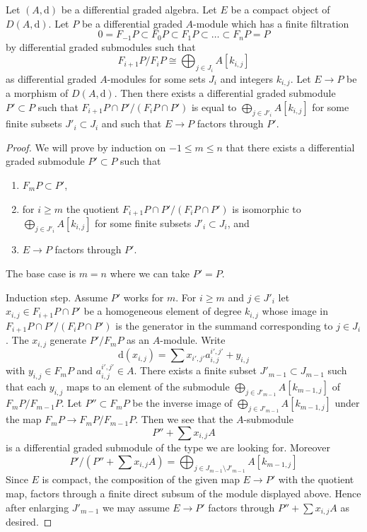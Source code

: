 \begin{lemma}
\label{lemma-factor-through-nicer}
Let $(A, \text{d})$ be a differential graded algebra. Let $E$ be a compact
object of $D(A, \text{d})$. Let $P$ be a differential graded $A$-module
which has a finite filtration
$$
0 = F_{-1}P \subset F_0P \subset F_1P \subset \ldots \subset F_nP = P
$$
by differential graded submodules such that
$$
F_{i + 1}P/F_iP \cong \bigoplus\nolimits_{j \in J_i} A[k_{i, j}]
$$
as differential graded $A$-modules for some sets $J_i$ and integers $k_{i, j}$.
Let $E \to P$ be a morphism of $D(A, \text{d})$.
Then there exists a differential graded submodule $P' \subset P$ such that
$F_{i + 1}P \cap P'/(F_iP \cap P')$ is equal to
$\bigoplus_{j \in J'_i} A[k_{i, j}]$ for some finite subsets
$J'_i \subset J_i$ and such that $E \to P$ factors through $P'$.
\end{lemma}

\begin{proof}
We will prove by induction on $-1 \leq m \leq n$ that there exists
a differential graded submodule $P' \subset P$  such that
\begin{enumerate}
\item $F_mP \subset P'$,
\item for $i \geq m$ the quotient $F_{i + 1}P \cap P'/(F_iP \cap P')$ is
isomorphic to $\bigoplus_{j \in J'_i} A[k_{i, j}]$ for some finite subsets
$J'_i \subset J_i$, and
\item $E \to P$ factors through $P'$.
\end{enumerate}
The base case is $m = n$ where we can take $P' = P$.

\medskip\noindent
Induction step. Assume $P'$ works for $m$.
For $i \geq m$ and $j \in J'_i$ let $x_{i, j} \in F_{i + 1}P \cap P'$
be a homogeneous element of degree $k_{i, j}$ whose image in
$F_{i + 1}P \cap P'/(F_iP \cap P')$ is the generator in
the summand corresponding to $j \in J_i$. The
$x_{i, j}$ generate $P'/F_mP$ as an $A$-module. Write
$$
\text{d}(x_{i, j}) = \sum x_{i', j'} a_{i, j}^{i', j'} + y_{i, j}
$$
with $y_{i, j} \in F_mP$ and $a_{i, j}^{i', j'} \in A$.
There exists a finite subset
$J'_{m - 1} \subset J_{m - 1}$ such that each $y_{i, j}$ maps to
an element of the submodule $\bigoplus_{j \in J'_{m - 1}} A[k_{m - 1, j}]$
of $F_mP/F_{m - 1}P$. Let $P'' \subset F_mP$ be the inverse
image of $\bigoplus_{j \in J'_{m - 1}} A[k_{m - 1, j}]$ under
the map $F_mP \to F_mP/F_{m - 1}P$. Then we see that the $A$-submodule
$$
P'' + \sum x_{i, j}A
$$
is a differential graded submodule of the type we are looking for. Moreover
$$
P'/(P'' + \sum x_{i, j}A) =
\bigoplus\nolimits_{j \in J_{m - 1} \setminus J'_{m - 1}} A[k_{m - 1, j}]
$$
Since $E$ is compact, the composition of the given map $E \to P'$
with the quotient map, factors through a finite direct subsum of
the module displayed above. Hence after enlarging $J'_{m - 1}$
we may assume $E \to P'$ factors through
$P'' + \sum x_{i, j}A$ as desired.
\end{proof}
